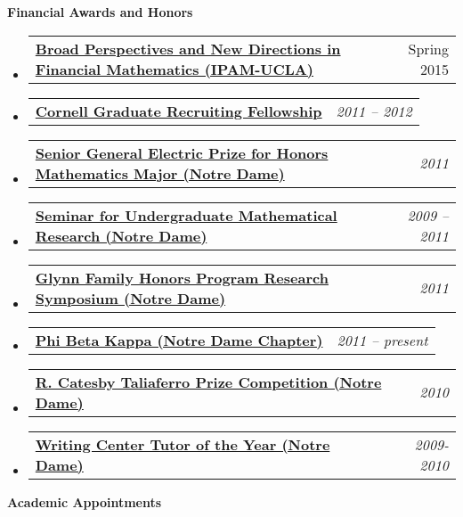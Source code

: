 \documentclass[letterpaper,11pt]{article}
\makeatletter
\newcommand{\resheading}[1]{{\large {\textbf{#1 \vphantom{p\^{E}}}}}}
\newenvironment{widetable}[1]
	       {\begin{tabular*}{#1}[t]{l@{\extracolsep{\fill}}r}}
	       {\end{tabular*}}
\newcommand{\resitemdate}[2]{
  \begin{widetable}{\textwidth - 28pt}
		\textbf{#1} & #2 \\
  \end{widetable}
  \vspace{-18pt}}
\makeatother
\begin{document}
\resheading{Financial Awards and Honors}
\begin{itemize}
\item \resitemdate{\href{http://www.ipam.ucla.edu/programs/long-programs/broad-perspectives-and-new-directions-in-financial-mathematics/}{Broad Perspectives and New Directions in Financial Mathematics (IPAM-UCLA)}}{Spring 2015}
\item
  \resitemdate{\href{http://www.math.cornell.edu/Graduate/Funds/fellowships.html}{Cornell Graduate Recruiting Fellowship}}{\emph{2011 -- 2012}}
\item
  \resitemdate{\href{http://math.nd.edu/awards-and-recognition/undergraduate-awards/undergraduate-awards-2011/}{Senior General Electric Prize for Honors Mathematics Major (Notre Dame)}}{\emph{2011}} 
\item \resitemdate{\href{http://nd.edu/~sumr/}{Seminar for Undergraduate Mathematical Research (Notre Dame)}}{\emph{2009 -- 2011}}
\item \resitemdate{\href{http://glynnhonors.nd.edu/beyond/final-symposium/index.shtml}{Glynn Family Honors Program Research Symposium (Notre Dame)}}{\emph{2011}}

\item \resitemdate{\href{http://www.pbk.org/}{Phi Beta Kappa (Notre Dame Chapter)}}{\emph{2011 -- present}}

\item \resitemdate{\href{http://math.nd.edu/awards-and-recognition/undergraduate-awards/undergraduate-awards-2010/}{R. Catesby Taliaferro Prize Competition (Notre Dame)}}{\emph{2010}}


\item \resitemdate{\href{http://writingcenter.nd.edu/}{Writing Center Tutor of the Year (Notre Dame)}}{\emph{2009-2010}}

\end{itemize}

\resheading{Academic Appointments}
\end{document}
